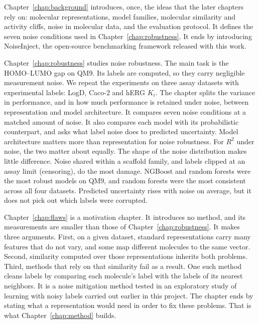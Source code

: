 Chapter~\ref{chap:background} introduces, once, the ideas that the later chapters rely on: molecular representations, model families, molecular similarity and activity cliffs, noise in molecular data, and the evaluation protocol. It defines the seven noise conditions used in Chapter~\ref{chap:robustness}. It ends by introducing NoiseInject, the open-source benchmarking framework released with this work.

Chapter~\ref{chap:robustness} studies noise robustness. The main task is the HOMO--LUMO gap on QM9. Its labels are computed, so they carry negligible measurement noise. We repeat the experiments on three assay datasets with experimental labels: LogD, Caco-2 and hERG $K_i$. The chapter splits the variance in performance, and in how much performance is retained under noise, between representation and model architecture. It compares seven noise conditions at a matched amount of noise. It also compares each model with its probabilistic counterpart, and asks what label noise does to predicted uncertainty. Model architecture matters more than representation for noise robustness. For $R^2$ under noise, the two matter about equally. The shape of the noise distribution makes little difference. Noise shared within a scaffold family, and labels clipped at an assay limit (censoring), do the most damage. NGBoost and random forests were the most robust models on QM9, and random forests were the most consistent across all four datasets. Predicted uncertainty rises with noise on average, but it does not pick out which labels were corrupted.

Chapter~\ref{chap:flaws} is a motivation chapter. It introduces no method, and its measurements are smaller than those of Chapter~\ref{chap:robustness}. It makes three arguments. First, on a given dataset, standard representations carry many features that do not vary, and some map different molecules to the same vector. Second, similarity computed over those representations inherits both problems. Third, methods that rely on that similarity fail as a result. One such method cleans labels by comparing each molecule's label with the labels of its nearest neighbors. It is a noise mitigation method tested in an exploratory study of learning with noisy labels carried out earlier in this project. The chapter ends by stating what a representation would need in order to fix these problems. That is what Chapter~\ref{chap:method} builds.

